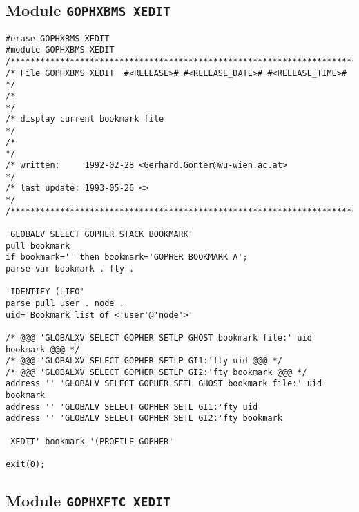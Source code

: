 \subsection{Module {\tt GOPHXBMS XEDIT}}

\def\LPtopD{Module {\tt GOPHXBMS XEDIT}}

\def\LPtopF{~}

\begin{verbatim}
#erase GOPHXBMS XEDIT
#module GOPHXBMS XEDIT
/***********************************************************************/
/* File GOPHXBMS XEDIT  #<RELEASE># #<RELEASE_DATE># #<RELEASE_TIME>#  */
/*                                                                     */
/* display current bookmark file                                       */
/*                                                                     */
/* written:     1992-02-28 <Gerhard.Gonter@wu-wien.ac.at>              */
/* last update: 1993-05-26 <>                                          */
/***********************************************************************/

'GLOBALV SELECT GOPHER STACK BOOKMARK'
pull bookmark
if bookmark='' then bookmark='GOPHER BOOKMARK A';
parse var bookmark . fty .

'IDENTIFY (LIFO'
parse pull user . node .
uid='Bookmark list of <'user'@'node'>'

/* @@@ 'GLOBALXV SELECT GOPHER SETLP GHOST bookmark file:' uid bookmark @@@ */
/* @@@ 'GLOBALXV SELECT GOPHER SETLP GI1:'fty uid @@@ */
/* @@@ 'GLOBALXV SELECT GOPHER SETLP GI2:'fty bookmark @@@ */
address '' 'GLOBALV SELECT GOPHER SETL GHOST bookmark file:' uid bookmark
address '' 'GLOBALV SELECT GOPHER SETL GI1:'fty uid
address '' 'GLOBALV SELECT GOPHER SETL GI2:'fty bookmark

'XEDIT' bookmark '(PROFILE GOPHER'

exit(0);
\end{verbatim}

\subsection{Module {\tt GOPHXFTC XEDIT}}

\def\LPtopD{Module {\tt GOPHXFTC XEDIT}}

\def\LPtopF{~}

